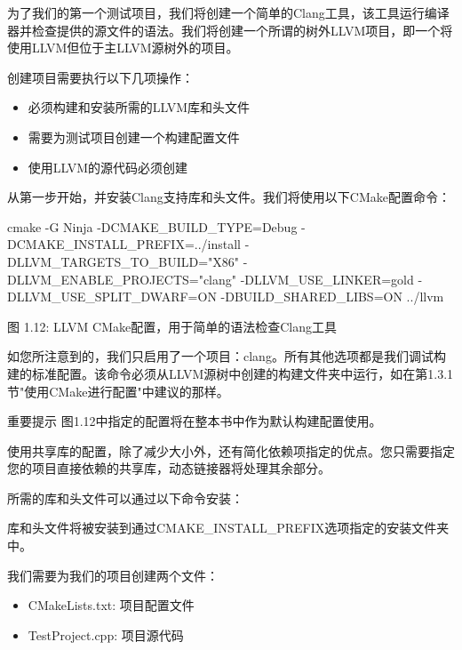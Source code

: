 为了我们的第一个测试项目，我们将创建一个简单的Clang工具，该工具运行编译器并检查提供的源文件的语法。我们将创建一个所谓的树外LLVM项目，即一个将使用LLVM但位于主LLVM源树外的项目。

创建项目需要执行以下几项操作：

\begin{itemize}
\item
必须构建和安装所需的LLVM库和头文件

\item
需要为测试项目创建一个构建配置文件

\item
使用LLVM的源代码必须创建
\end{itemize}

从第一步开始，并安装Clang支持库和头文件。我们将使用以下CMake配置命令：

\begin{shell}
cmake -G Ninja -DCMAKE_BUILD_TYPE=Debug -DCMAKE_INSTALL_PREFIX=../install -DLLVM_TARGETS_TO_BUILD="X86" -DLLVM_ENABLE_PROJECTS="clang" -DLLVM_USE_LINKER=gold -DLLVM_USE_SPLIT_DWARF=ON -DBUILD_SHARED_LIBS=ON ../llvm
\end{shell}

\begin{center}
图 1.12: LLVM CMake配置，用于简单的语法检查Clang工具
\end{center}

如您所注意到的，我们只启用了一个项目：clang。所有其他选项都是我们调试构建的标准配置。该命令必须从LLVM源树中创建的构建文件夹中运行，如在第1.3.1节"使用CMake进行配置"中建议的那样。

\begin{myNotic}{重要提示}
图1.12中指定的配置将在整本书中作为默认构建配置使用。
\end{myNotic}

使用共享库的配置，除了减少大小外，还有简化依赖项指定的优点。您只需要指定您的项目直接依赖的共享库，动态链接器将处理其余部分。

所需的库和头文件可以通过以下命令安装：


库和头文件将被安装到通过CMAKE\_INSTALL\_PREFIX选项指定的安装文件夹中。

我们需要为我们的项目创建两个文件：

\begin{itemize}
\item
CMakeLists.txt: 项目配置文件

\item
TestProject.cpp: 项目源代码
\end{itemize}

